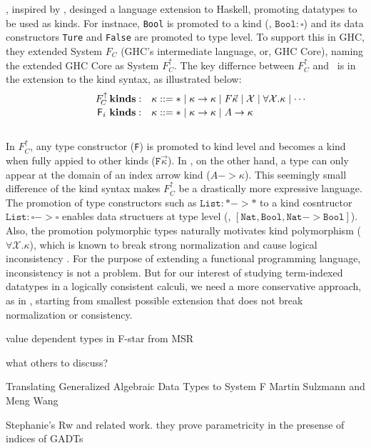 \citet{YorgeyWCJVM12}, inspired by \cite{SHE}, desinged a language extension
to Haskell, promoting datatypes to be used as kinds. For instnace, \texttt{Bool}
is promoted to a kind (\ie, $\texttt{Bool}:\square$) and its data constructors
\texttt{Ture} and \texttt{False} are promoted to type level. To support this
in GHC, they extended System $F_{\!C}$ (GHC's intermediate language, or,
GHC Core), naming the extended GHC Core as System $F_{\!C}^\uparrow$.
The key differnce between $F_{\!C}^\uparrow$ and \Fi\ is in the extension
to the kind syntax, as illustrated below: \vspace*{-2pt}
\[\qquad\quad
\begin{array}{ll}
F_{\!C}^\uparrow\,\textbf{kinds}: &
\kappa ::= * \mid \kappa -> \kappa \mid F \vec{\kappa} \mid \mathcal{X} \mid \forall \mathcal{X}.\kappa \mid \cdots \\
\,\Fi\,\,\textbf{kinds}: &
\kappa ::= * \mid \kappa -> \kappa \mid A -> \kappa \phantom{A^{A^A}}
\end{array}  
\] ~\vspace*{-6pt}\\
In $F_{\!C}^\uparrow$, any type constructor (\texttt{F}) is promoted to 
kind level and becomes a kind when fully appied to other kinds
($\texttt{F}\vec\kappa$). In \Fi, on the other hand, a type can only appear
at the domain of an index arrow kind ($A-> \kappa$). This seemingly small
difference of the kind syntax makes $F_{\!C}^\uparrow$ be a drastically more
expressive language. The promotion of type constructors such as
$\texttt{List}:* -> *$ to a kind cosntructor $\texttt{List}:\square -> \square$
enables data structuers at type level (\eg, $\mathtt{[Nat,Bool,Nat-> Bool]}$).
Also, the promotion polymorphic types naturally motivates kind polymorphism
($\forall \mathcal{X}.\kappa$), which is known to break strong normalization
and cause logical inconsistency \cite{Girard72}. For the purpose of extending
a functional programming language, inconsistency is not a problem. But for
our interest of studying term-indexed datatypes in a logically consistent
calculi, we need a more conservative approach, as in \Fi, starting from
smallest possible extension that does not break normalization or consistency.


\citet{Swamy11}
value dependent types in F-star  from MSR


what others to discuss?

Translating Generalized Algebraic Data Types to System F
Martin Sulzmann and Meng Wang

Stephanie's Rw and related work.
they prove parametricity in the presense of indices of GADTs
